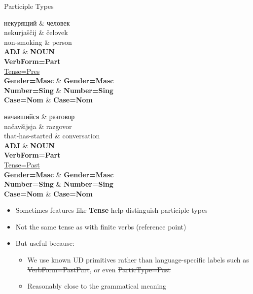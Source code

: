 \documentclass[10pt, compress, aspectratio=169]{beamer}
\newcommand{\upos}[1]{\textbf{\color{blue}#1}}
\newcommand{\feat}[1]{\textbf{\footnotesize\color{red}#1}}
\newcommand{\hlfeat}[1]{{\footnotesize\color{purple}\underline{#1}}}
\newcommand{\badfeat}[1]{{\footnotesize\color{purple}\sout{#1}}}
\newcommand{\ru}[1]{{\rufont #1}}
\begin{document}
\begin{frame}{Participle Types}
\begin{dependency}[label style={thick, font=\bfseries}]
\begin{deptext}[font=\bfseries]
\ru{некурящий} \& \ru{человек} \\
nekurjaščij \& čelovek \\
non-smoking \& person \\
\upos{ADJ} \& \upos{NOUN} \\
\feat{VerbForm=Part} \\
\hlfeat{Tense=Pres} \\
\feat{Gender=Masc} \& \feat{Gender=Masc} \\
\feat{Number=Sing} \& \feat{Number=Sing} \\
\feat{Case=Nom} \& \feat{Case=Nom} \\
\end{deptext}
\end{dependency}
\hspace{0.9cm}
\begin{dependency}[label style={thick, font=\bfseries}]
\begin{deptext}[font=\bfseries]
\ru{начавшийся} \& \ru{разговор} \\
načavšijsja \& razgovor \\
that-has-started \& conversation \\
\upos{ADJ} \& \upos{NOUN} \\
\feat{VerbForm=Part} \\
\hlfeat{Tense=Past} \\
\feat{Gender=Masc} \& \feat{Gender=Masc} \\
\feat{Number=Sing} \& \feat{Number=Sing} \\
\feat{Case=Nom} \& \feat{Case=Nom} \\
\end{deptext}
\end{dependency}

\begin{itemize}
\item Sometimes features like \feat{Tense} help distinguish participle types
\item Not the same tense as with finite verbs (reference point)
\item But useful because:
\begin{itemize}
\item We use known UD primitives rather than language-specific labels such as \badfeat{VerbForm=PastPart}, or even \badfeat{ParticType=Past}
\item Reasonably close to the grammatical meaning
\end{itemize}
\end{itemize}
\end{frame}
\end{document}
